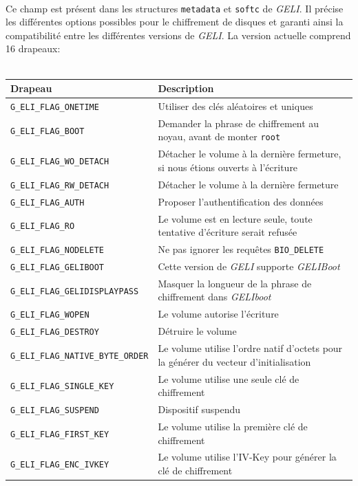 \paragraph{}
Ce champ est présent dans les structures \texttt{metadata} et \texttt{softc} de
\textit{GELI}. Il précise les différentes options possibles pour le chiffrement
de disques et garanti ainsi la compatibilité entre les différentes versions de
\textit{GELI}. La version actuelle comprend 16 drapeaux: \\
\\
\begin{tabularx}{\linewidth}{ | l | X | }
  \hline
  \textbf{Drapeau}                            & \textbf{Description} \\
  \hline
  \texttt{G\_ELI\_FLAG\_ONETIME}             & Utiliser des clés aléatoires et
  uniques \\
  \texttt{G\_ELI\_FLAG\_BOOT}                & Demander la phrase de
  chiffrement au noyau, avant de monter \texttt{root} \\
  \texttt{G\_ELI\_FLAG\_WO\_DETACH}          & Détacher le volume à la dernière
  fermeture, si nous étions ouverts à l'écriture \\
  \texttt{G\_ELI\_FLAG\_RW\_DETACH}          & Détacher le volume à la dernière
  fermeture \\
  \texttt{G\_ELI\_FLAG\_AUTH}                & Proposer l'authentification des
  données \\
  \texttt{G\_ELI\_FLAG\_RO}                  & Le volume est en lecture seule,
  toute tentative d'écriture serait refusée \\
  \texttt{G\_ELI\_FLAG\_NODELETE}            & Ne pas ignorer les requêtes
  \texttt{BIO\_DELETE} \\
  \texttt{G\_ELI\_FLAG\_GELIBOOT}           & Cette version de \textit{GELI}
  supporte \textit{GELIBoot} \\
  \texttt{G\_ELI\_FLAG\_GELIDISPLAYPASS}    & Masquer la longueur de la phrase
  de chiffrement dans \textit{GELIboot} \\
  \texttt{G\_ELI\_FLAG\_WOPEN}               & Le volume autorise l'écriture \\
  \texttt{G\_ELI\_FLAG\_DESTROY}             & Détruire le volume \\
  \texttt{G\_ELI\_FLAG\_NATIVE\_BYTE\_ORDER} & Le volume utilise l'ordre natif
  d'octets pour la générer du vecteur d'initialisation \\
  \texttt{G\_ELI\_FLAG\_SINGLE\_KEY}         & Le volume utilise une seule clé
  de chiffrement \\
  \texttt{G\_ELI\_FLAG\_SUSPEND}             & Dispositif suspendu \\
  \texttt{G\_ELI\_FLAG\_FIRST\_KEY}          & Le volume utilise la première
  clé de chiffrement \\
  \texttt{G\_ELI\_FLAG\_ENC\_IVKEY}          & Le volume utilise l'IV-Key pour
  générer la clé de chiffrement \\
  \hline
\end{tabularx}

